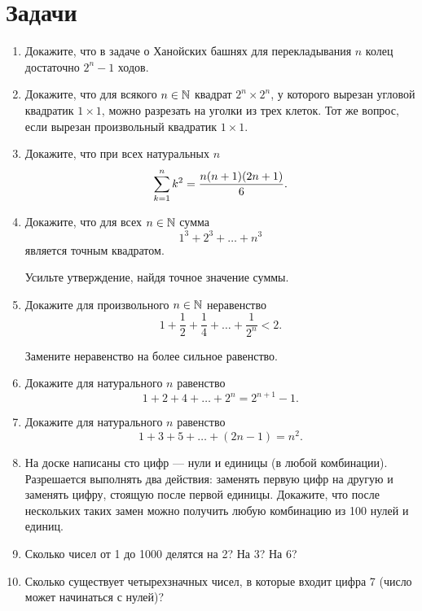 \section{Задачи}

\begin{enumerate}
    \item Докажите, что в задаче о Ханойских башнях для перекладывания
        $n$ колец достаточно $2^n - 1$ ходов.
    \item Докажите, что для всякого $n \in \mathbb{N}$ квадрат $2^n \times
        2^n$, у которого вырезан угловой квадратик $1 \times 1$, можно
        разрезать на уголки из трех клеток. Тот же вопрос, если
        вырезан произвольный квадратик $1 \times 1$.
    \item Докажите, что при всех натуральных $n$
        \[
            \sum\limits_{k=1}^n k^2 = \frac{n(n+1)(2n+1)}6.
            \]
    \item Докажите, что для всех $n \in \mathbb{N}$ сумма
        \[
            1^3 + 2^3 + \ldots + n^3
            \]
        является точным квадратом.
        \begin{hint}
            Усильте утверждение, найдя точное значение суммы.
        \end{hint}
    \item Докажите для произвольного $n \in \mathbb{N}$ неравенство
        \[
            1 + \frac12 + \frac14 + \ldots + \frac1{2^n} < 2.
            \]
        \begin{hint}
            Замените неравенство на более сильное равенство.
        \end{hint}
    \item Докажите для натурального $n$ равенство
        \[
            1 + 2 + 4 + \ldots + 2^n = 2^{n+1} - 1.
            \]
    \item Докажите для натурального $n$ равенство
        \[
            1 + 3 + 5 + \ldots + (2n - 1) = n^2.
            \]
    \item На доске написаны сто цифр --- нули и единицы (в любой
        комбинации). Разрешается выполнять два действия: заменять
        первую цифр на другую и заменять цифру, стоящую после первой
        единицы. Докажите, что после нескольких таких замен можно
        получить любую комбинацию из 100 нулей и единиц.

    \item Сколько чисел от 1 до 1000 делятся на 2? На 3? На 6?

    \item Сколько существует четырехзначных чисел, в которые
        входит цифра 7 (число может начинаться с нулей)?


\end{enumerate}

